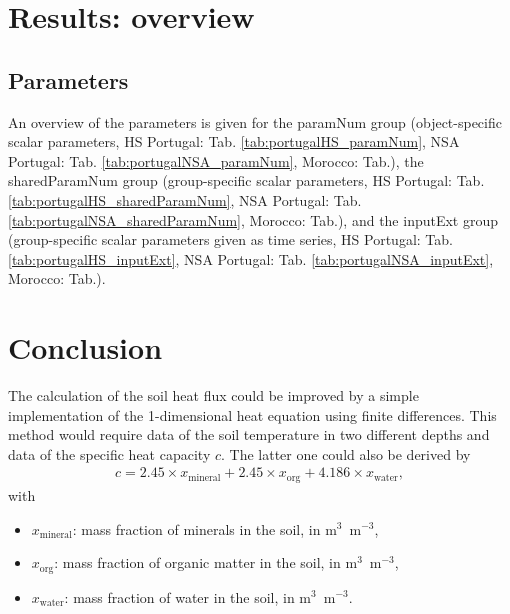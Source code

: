 \documentclass{scrreprt}
\newenvironment{denseitem}{
  \begin{itemize}
    \setlength{\itemsep}{0pt}
    \setlength{\parskip}{0pt}
    \setlength{\parsep}{0pt}
}{
  \end{itemize}
}
\begin{document}

\chapter{Results: overview} \label{ch:results}

\section{Parameters} \label{sec:results_par}

An overview of the parameters is given for the \textsf{paramNum} group (object-specific scalar parameters, HS Portugal: Tab. \ref{tab:portugalHS_paramNum}, NSA Portugal: Tab. \ref{tab:portugalNSA_paramNum}, Morocco: Tab.), the \textsf{sharedParamNum} group (group-specific scalar parameters, HS Portugal: Tab. \ref{tab:portugalHS_sharedParamNum}, NSA Portugal: Tab. \ref{tab:portugalNSA_sharedParamNum}, Morocco: Tab.), and the \textsf{inputExt} group (group-specific scalar parameters given as time series, HS Portugal: Tab. \ref{tab:portugalHS_inputExt}, NSA Portugal: Tab. \ref{tab:portugalNSA_inputExt}, Morocco: Tab.).














\chapter{Conclusion} \label{ch:conclusion}

The calculation of the soil heat flux could be improved by a simple implementation of the 1-dimensional heat equation using finite differences.
This method would require data of the soil temperature in two different depths and data of the specific heat capacity $c$.
The latter one could also be derived by
%
\begin{align*}
  c = 2.45 \times x_\text{mineral} + 2.45 \times x_\text{org} + 4.186 \times x_\text{water},
\end{align*}
%
with
\begin{denseitem}
  \item[] $x_\text{mineral}$: mass fraction of minerals in the soil, in m$^3$~m$^{-3}$,
  \item[] $x_\text{org}$: mass fraction of organic matter in the soil, in m$^3$~m$^{-3}$,
  \item[] $x_\text{water}$: mass fraction of water in the soil, in m$^3$~m$^{-3}$.
\end{denseitem}




\end{document}
